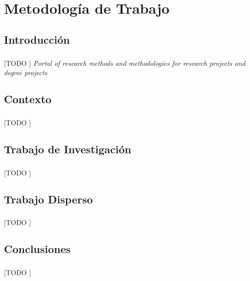 \documentclass{subfiles}
\begin{document}
  \chapter{Metodología de Trabajo}
  \label{chap:methodology}

    \section{Introducción}
    \label{sec:methodology_intro}

      \paragraph{}
      [TODO ] \emph{Portal of research methods and methodologies for research projects and degree projects} \cite{haakansson2013portal}

    \section{Contexto}
    \label{sec:methodology_contex}

      \paragraph{}
      [TODO ]

    \section{Trabajo de Investigación}
    \label{sec:methodology_research}

      \paragraph{}
      [TODO ]

    \section{Trabajo Disperso}
    \label{sec:methodology_sparse}

      \paragraph{}
      [TODO ]

    \section{Conclusiones}
    \label{sec:methodology_conclusions}

      \paragraph{}
      [TODO ]
\end{document}
